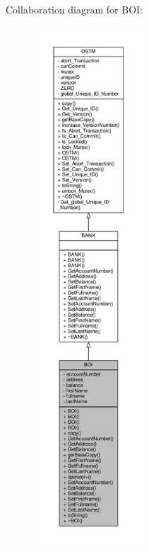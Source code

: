 Collaboration diagram for B\+OI\+:
\nopagebreak
\begin{figure}[H]
\begin{center}
\leavevmode
\includegraphics[height=550pt]{class_b_o_i__coll__graph}
\end{center}
\end{figure}
